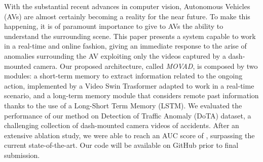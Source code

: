 With the substantial recent advances in computer vision, Autonomous Vehicles (AVs) are almost certainly becoming a reality for the near future.
To make this happening, it is of paramount importance to give to AVs the ability to understand the surrounding scene.
This paper presents a system capable to work in a real-time and online fashion, giving an immediate response to the arise of anomalies surrounding the AV exploiting only the videos captured by a dash-mounted camera.
Our proposed architecture, called \emph{MOVAD}, is composed by two modules: a short-term memory to extract information related to the ongoing action, implemented by a Video Swin Trasformer adapted to work in a real-time scenario, and a long-term memory module that considers remote past information thanks to the use of a Long-Short Term Memory (LSTM).
We evaluated the performance of our method on Detection of Traffic Anomaly (DoTA) dataset, a challenging collection of dash-mounted camera videos of accidents.
After an extensive ablation study, we were able to reach an AUC score of , surpassing the current state-of-the-art.
Our code will be available on GitHub prior to final submission.